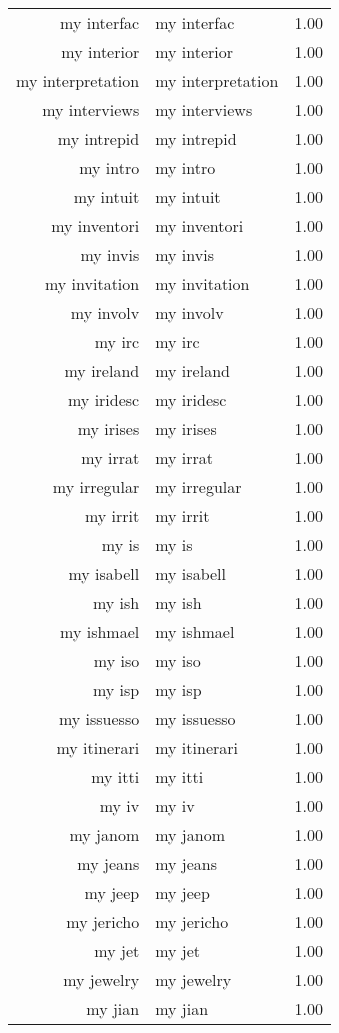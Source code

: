 \begin{table}[ht]
\begin{tabular}{rlr}
  my interfac & my interfac & 1.00 \\ 
  my interior & my interior & 1.00 \\ 
  my interpretation & my interpretation & 1.00 \\ 
  my interviews & my interviews & 1.00 \\ 
  my intrepid & my intrepid & 1.00 \\ 
  my intro & my intro & 1.00 \\ 
  my intuit & my intuit & 1.00 \\ 
  my inventori & my inventori & 1.00 \\ 
  my invis & my invis & 1.00 \\ 
  my invitation & my invitation & 1.00 \\ 
  my involv & my involv & 1.00 \\ 
  my irc & my irc & 1.00 \\ 
  my ireland & my ireland & 1.00 \\ 
  my iridesc & my iridesc & 1.00 \\ 
  my irises & my irises & 1.00 \\ 
  my irrat & my irrat & 1.00 \\ 
  my irregular & my irregular & 1.00 \\ 
  my irrit & my irrit & 1.00 \\ 
  my is & my is & 1.00 \\ 
  my isabell & my isabell & 1.00 \\ 
  my ish & my ish & 1.00 \\ 
  my ishmael & my ishmael & 1.00 \\ 
  my iso & my iso & 1.00 \\ 
  my isp & my isp & 1.00 \\ 
  my issuesso & my issuesso & 1.00 \\ 
  my itinerari & my itinerari & 1.00 \\ 
  my itti & my itti & 1.00 \\ 
  my iv & my iv & 1.00 \\ 
  my janom & my janom & 1.00 \\ 
  my jeans & my jeans & 1.00 \\ 
  my jeep & my jeep & 1.00 \\ 
  my jericho & my jericho & 1.00 \\ 
  my jet & my jet & 1.00 \\ 
  my jewelry & my jewelry & 1.00 \\ 
  my jian & my jian & 1.00 \\ 

\end{tabular}
\end{table}
